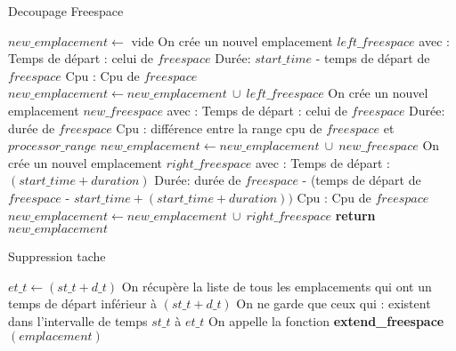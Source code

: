 \documentclass{report}
\begin{document}
\begin{algorithm}
\caption{Decoupage Freespace}\label{cut_freespace}
\begin{algorithmic}[1]
	\State $new\_emplacement \gets$ vide
	\State
		\State On crée un nouvel emplacement $left\_freespace$ avec :
			\State \hspace{\algorithmicindent} Temps de départ : celui de $freespace$
			\State \hspace{\algorithmicindent} Durée: $start\_time$ - temps de départ de $freespace$
			\State \hspace{\algorithmicindent} Cpu : Cpu de $freespace$
		\State $new\_emplacement \gets new\_emplacement\ \cup\ left\_freespace$ 
	\EndIf
	\State
		\State On crée un nouvel emplacement $new\_freespace$ avec :
			\State \hspace{\algorithmicindent} Temps de départ : celui de $freespace$
			\State \hspace{\algorithmicindent} Durée: durée de $freespace$
			\State \hspace{\algorithmicindent} Cpu : différence entre la range cpu de $freespace$ et $processor\_range$
		\State $new\_emplacement \gets new\_emplacement\ \cup\ new\_freespace$ 
	\EndIf
	\State
	\State On crée un nouvel emplacement $right\_freespace$ avec :
		\State \hspace{\algorithmicindent} Temps de départ : $(start\_time + duration)$
		\State \hspace{\algorithmicindent} Durée: durée de $freespace$ - (temps de départ de $freespace$ - $start\_time + (start\_time + duration))$
		\State \hspace{\algorithmicindent} Cpu : Cpu de $freespace$
	\State $new\_emplacement \gets new\_emplacement\ \cup\ right\_freespace$ 
	\State
	\State \textbf{return} $new\_emplacement$
\EndFunction
\end{algorithmic}
\end{algorithm}

\begin{algorithm}
\caption{Suppression tache}\label{Remove}
\begin{algorithmic}[1]
	\State $et\_t \gets (st\_t + d\_t)$
	\State
	\State On récupère la liste de tous les emplacements qui ont un temps de départ inférieur à $(st\_t + d\_t)$ 
	\State
	\State On ne garde que ceux qui :
		\State \hspace{\algorithmicindent} existent dans l'intervalle de temps $st\_t$ à $et\_t$
	\State
		\State On appelle la fonction \textbf{extend\_freespace}$(emplacement)$
	\EndFor
\EndFunction
\end{algorithmic}
\end{algorithm}
\end{document}
